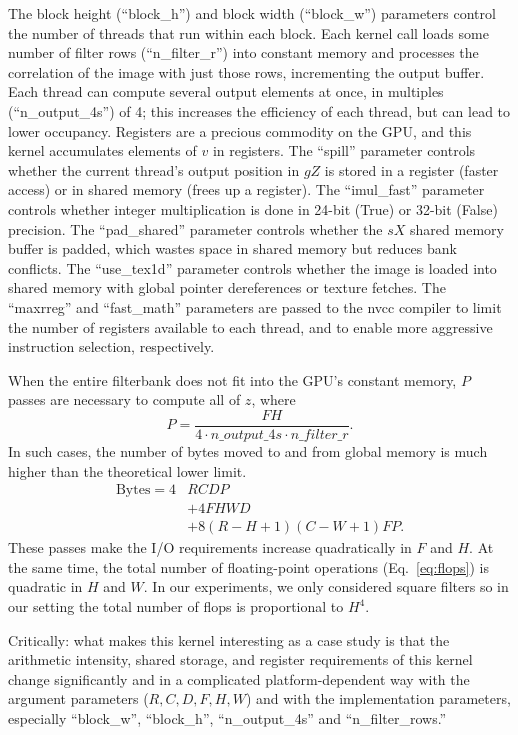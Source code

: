 \documentclass{sig-alternate}
\begin{document}
The block height (``block\_h'') and block width (``block\_w'') parameters control the
number of threads that run within each block.
Each kernel call loads some number of filter rows (``n\_filter\_r'') into
constant memory and processes the correlation of the image with just those
rows, incrementing the output buffer.
Each thread can compute several output elements
at once, in multiples (``n\_output\_4s'') of 4;
this increases the efficiency of each thread, but can lead to lower occupancy.
Registers are a precious commodity on the GPU, and this kernel accumulates
elements of $v$ in registers.
The ``spill'' parameter controls whether the current thread's output position in
$gZ$ is stored in a register (faster access) or in shared memory (frees up
a register).
The ``imul\_fast'' parameter controls whether integer multiplication is done
in 24-bit (True) or 32-bit (False) precision.
The ``pad\_shared'' parameter controls whether the $sX$ shared memory buffer
is padded, which wastes space in shared memory but reduces bank conflicts.
The ``use\_tex1d'' parameter controls whether the image is loaded into shared
memory with global pointer dereferences or texture fetches.
The ``maxrreg'' and ``fast\_math'' parameters are passed to the nvcc compiler to limit
the number of registers available to each thread, and to enable more aggressive instruction selection, respectively.


When the entire filterbank does not fit into the GPU's
constant memory, $P$ passes are necessary to compute all of $z$, where
$$P=\frac{FH}{4 \cdot n\_output\_4s \cdot n\_filter\_r}.$$
In such cases, the number of bytes moved to and from global memory is much higher than
the theoretical lower limit.
\begin{align}
\mathrm{Bytes} = 4&RCDP \nonumber \\
& + 4FHWD \nonumber \\
& + 8(R-H+1)(C-W+1)FP.
\nonumber
\label{eq:bytesP}
\end{align}
These passes make the I/O requirements increase quadratically in $F$ and $H$.
At the same time, the total number of floating-point operations (Eq.~\ref{eq:flops})
is quadratic in $H$ and $W$. In our experiments, we only considered square
filters so in our setting the total number of flops is proportional to $H^4$.

Critically:
what makes this kernel interesting as a case study is that the
arithmetic intensity, shared storage, and register requirements
of this kernel change significantly and in a complicated platform-dependent way
with the argument parameters ($R, C, D, F, H, W$) and with the implementation parameters,
especially ``block\_w'', ``block\_h'', ``n\_output\_4s'' and ``n\_filter\_rows.''
\end{document}
